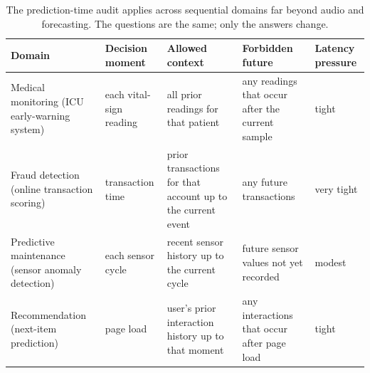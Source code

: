 \begin{table}[t]
\centering
\small
\setlength{\tabcolsep}{3pt}
\small
\begin{tabular}{L{2.60cm}L{1.85cm}L{2.07cm}L{1.60cm}L{1.43cm}}
\toprule
Domain & Decision moment & Allowed context & Forbidden future & Latency pressure \\
\midrule
Medical monitoring (ICU early-warning system) & each vital-sign reading & all prior readings for that patient & any readings that occur after the current sample & tight \\
Fraud detection (online transaction scoring) & transaction time & prior transactions for that account up to the current event & any future transactions & very tight \\
Predictive maintenance (sensor anomaly detection) & each sensor cycle & recent sensor history up to the current cycle & future sensor values not yet recorded & modest \\
Recommendation (next-item prediction) & page load & user's prior interaction history up to that moment & any interactions that occur after page load & tight \\
\bottomrule
\end{tabular}
\caption{The prediction-time audit applies across sequential domains far beyond audio and forecasting. The questions are the same; only the answers change.}
\label{tab:prediction-time-breadth}
\end{table}

